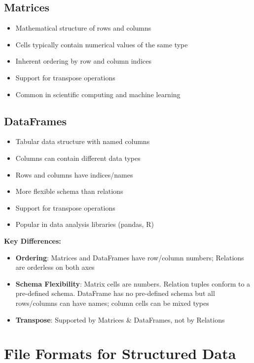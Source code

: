 \documentclass[12pt]{article}
\begin{document}
\subsection{Matrices}
\begin{itemize}
    \item Mathematical structure of rows and columns
    \item Cells typically contain numerical values of the same type
    \item Inherent ordering by row and column indices
    \item Support for transpose operations
    \item Common in scientific computing and machine learning
\end{itemize}

\subsection{DataFrames}
\begin{itemize}
    \item Tabular data structure with named columns
    \item Columns can contain different data types
    \item Rows and columns have indices/names
    \item More flexible schema than relations
    \item Support for transpose operations
    \item Popular in data analysis libraries (pandas, R)
\end{itemize}

\begin{tcolorbox}[colback=blue!5!white,colframe=blue!75!black,title=Comparing Structured Data Models]
\textbf{Key Differences:}
\begin{itemize}
    \item \textbf{Ordering}: Matrices and DataFrames have row/column numbers; Relations are orderless on both axes
    \item \textbf{Schema Flexibility}: Matrix cells are numbers. Relation tuples conform to a pre-defined schema. DataFrame has no pre-defined schema but all rows/columns can have names; column cells can be mixed types
    \item \textbf{Transpose}: Supported by Matrices \& DataFrames, not by Relations
\end{itemize}
\end{tcolorbox}

\section{File Formats for Structured Data}
\end{document}
